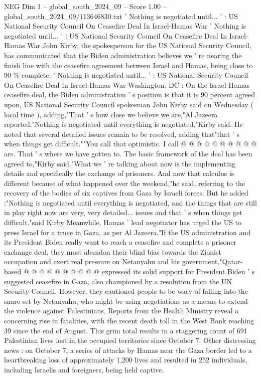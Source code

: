 \begin{textsample}{NEG Dim 1 – global\_south\_2024\_09 – Score 1.00 – global\_south\_2024\_09/113646830.txt}  \label{ex:f1_neg_426}
' Nothing is negotiated until... ' : US National Security Council On Ceasefire Deal In Israel-Hamas War ' Nothing is negotiated until... ' : US National Security Council On Ceasefire Deal In Israel-Hamas War John Kirby, the spokesperson for the US National Security Council, has communicated that the Biden administration believes we ' re nearing the finish line with the ceasefire agreement between Israel and Hamas, being close to 90 \% complete. ' Nothing is negotiated until... ' : US National Security Council On Ceasefire Deal In Israel-Hamas War Washington, DC : On the Israel-Hamas ceasefire deal, the Biden administration ' s position is that it is 90 percent agreed upon, US National Security Council spokesman John Kirby said on Wednesday ( local time ), adding,"That ' s how close we believe we are,"Al Jazeera reported."Nothing is negotiated until everything is negotiated,"Kirby said.
He noted that several detailed issues remain to be resolved, adding that"that ' s when things get difficult.""You call that optimistic.
I call @ @ @ @ @ @ @ @ @ @ are.
That ' s where we have gotten to.
The basic framework of the deal has been agreed to,"Kirby said."What we ' re talking about now is the implementing details and specifically the exchange of prisoners.
And now that calculus is different because of what happened over the weekend,"he said, referring to the recovery of the bodies of six captives from Gaza by Israeli forces.
But he added :"Nothing is negotiated until everything is negotiated, and the things that are still in play right now are very, very detailed... issues and that ' s when things get difficult."said Kirby Meanwhile, Hamas ' lead negotiator has urged the US to press Israel for a truce in Gaza, as per Al Jazeera."If the US administration and its President Biden really want to reach a ceasefire and complete a prisoner exchange deal, they must abandon their blind bias towards the Zionist occupation and exert real pressure on Netanyahu and his government,"Qatar-based @ @ @ @ @ @ @ @ @ @ expressed its solid support for President Biden ' s suggested ceasefire in Gaza, also championed by a resolution from the UN Security Council.
However, they cautioned people to be wary of falling into the snare set by Netanyahu, who might be using negotiations as a means to extend the violence against Palestinians.
Reports from the Health Ministry reveal a concerning rise in fatalities, with the recent death toll in the West Bank reaching 39 since the end of August.
This grim total results in a staggering count of 691 Palestinian lives lost in the occupied territories since October 7.
Other distressing news : on October 7, a series of attacks by Hamas near the Gaza border led to a heartbreaking loss of approximately 1,200 lives and resulted in 252 individuals, including Israelis and foreigners, being held captive.

\end{textsample}
